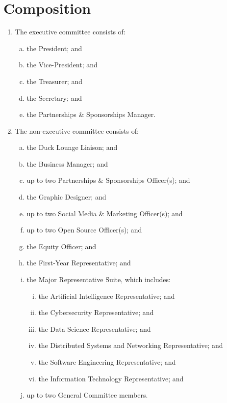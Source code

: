 \documentclass{schedule}
\begin{document}
\section{Composition}\label{composition}
\begin{enumerate}[(1)]
    \item The executive committee consists of:
          \begin{enumerate}[(a)]
              \item the President; and
              \item the Vice-President; and
              \item the Treasurer; and
              \item the Secretary; and
              \item the Partnerships \& Sponsorships Manager.
          \end{enumerate}
    \item The non-executive committee consists of:
          \begin{enumerate}[(a)]
              \item the Duck Lounge Liaison; and
              \item the Business Manager; and
              \item up to two Partnerships \& Sponsorships Officer(s); and
              \item the Graphic Designer; and
              \item up to two Social Media \& Marketing Officer(s); and
              \item up to two Open Source Officer(s); and
              \item the Equity Officer; and
              \item the First-Year Representative; and
              \item the Major Representative Suite, which includes:
                    \begin{enumerate}[(i)]
                        \item the Artificial Intelligence Representative; and
                        \item the Cybersecurity Representative; and
                        \item the Data Science Representative; and
                        \item the Distributed Systems and Networking Representative; and
                        \item the Software Engineering Representative; and
                        \item the Information Technology Representative; and
                    \end{enumerate}
              \item up to two General Committee members.
          \end{enumerate}
\end{enumerate}
\end{document}
